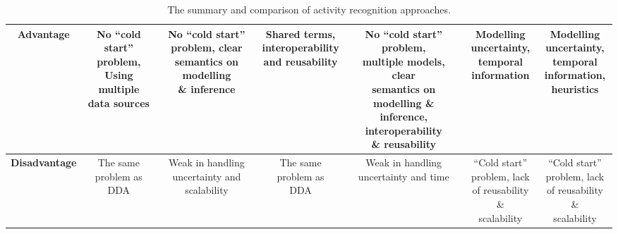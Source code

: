 \begin{sidewaystable}[htbp]
\begin{center}
\begin{tabular}{|c|c|c|c|c|c|c|}
	    \hline
	    \textbf{Advantage} & \specialcell{No ``cold start''\\problem,\\Using multiple\\data sources} & \specialcell{No ``cold start''\\problem, clear\\semantics on modelling\\\& inference} & \specialcell{Shared terms,\\interoperability\\and reusability} & \specialcell{No ``cold start'' problem,\\multiple models, clear\\semantics on modelling \&\\inference, interoperability\\\& reusability}  & \specialcell{Modelling\\uncertainty,\\temporal\\information} & \specialcell{Modelling\\uncertainty,\\temporal\\information,\\heuristics} \\
	    \hline
	    \textbf{Disadvantage} & \specialcell{The same\\problem as\\DDA} & \specialcell{Weak in handling\\uncertainty and\\scalability}  & \specialcell{The same\\problem as\\DDA} & \specialcell{Weak in handling\\uncertainty and time} & \specialcell{``Cold start''\\problem, lack\\of reusability \&\\scalability} & \specialcell{``Cold start''\\problem, lack\\of reusability \&\\scalability} \\
            \hline
        \end{tabular}
        \caption{The summary and comparison of activity recognition approaches.}
        \label{tab:soa:comparison}
    \end{center}
\end{sidewaystable}